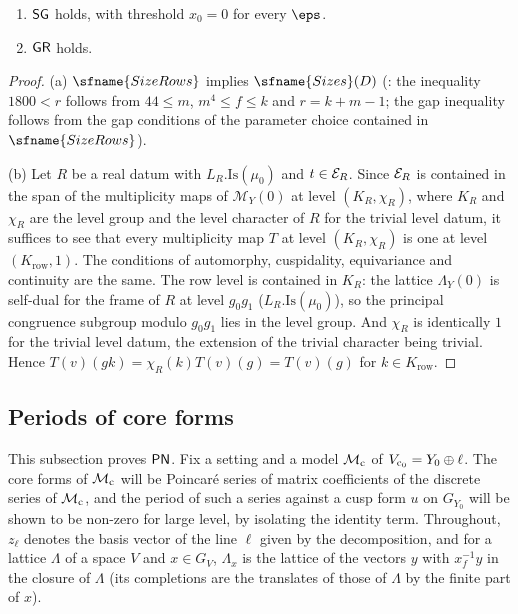 \begin{proposition}\label{pf:fs:sizeGap}
\begin{enumerate}[label=(\alph*)]
\item $\mathsf{SG}$ holds, with threshold $x_0=0$ for every $\eps$.
\item $\mathsf{GR}$ holds.
\end{enumerate}
\label{pf:fs:goodRows}
\end{proposition}

\begin{proof}
(a) $\sfname{SizeRows}$ implies $\sfname{Sizes}(D)$ (: the inequality $1800<r$
follows from $44\le m$, $m^4\le f\le k$ and $r=k+m-1$; the gap inequality follows from the gap conditions of the parameter choice
contained in $\sfname{SizeRows}$).

(b) Let $R$ be a real datum with $L_R.\mathrm{Is}(\mu_0)$ and $t\in\mathcal E_R$. Since $\mathcal E_R$ is contained in the span of the multiplicity
maps of $\mathcal M_Y(0)$ at level $(K_R,\chi_R)$, where $K_R$ and $\chi_R$ are the level group and the level character of $R$ for the
trivial level datum, it suffices to see that every multiplicity map $T$ at level $(K_R,\chi_R)$ is one at level $(K_{\mathrm{row}},1)$.
The conditions of automorphy, cuspidality, equivariance and continuity are the same. The row level is contained in $K_R$: the
lattice $\Lambda_Y(0)$ is self-dual for the frame of $R$ at level $g_0g_1$ ($L_R.\mathrm{Is}(\mu_0)$), so the principal congruence
subgroup modulo $g_0g_1$ lies in the level group. And $\chi_R$ is identically $1$
for the trivial level datum, the extension of the trivial character being trivial. Hence $T(v)(gk)=\chi_R(k)T(v)(g)=T(v)(g)$ for
$k\in K_{\mathrm{row}}$.
\end{proof}

\subsection{Periods of core forms}\label{sec:pf:fs:periods}

This subsection proves $\mathsf{PN}$. Fix a setting and a model $\mathcal M_{\mathrm{c}}$ of $V_{\mathrm{c}_0}=Y_0\oplus\ell$. The core forms
of $\mathcal M_{\mathrm{c}}$ will be Poincar\'e series of matrix coefficients of the discrete series of $\mathcal M_{\mathrm{c}}$, and the period
of such a series against a cusp form $u$ on $G_{Y_0}$ will be shown to be non-zero for large level, by isolating the identity
term. Throughout, $z_\ell$ denotes the basis vector of the line $\ell$ given by the decomposition, and for a lattice $\Lambda$ of a
space $V$ and $x\in G_V$, $\Lambda_x$ is the lattice of the vectors $y$ with $x_f^{-1}y$ in the closure of $\Lambda$ (its completions
are the translates of those of $\Lambda$ by the finite part of $x$).

